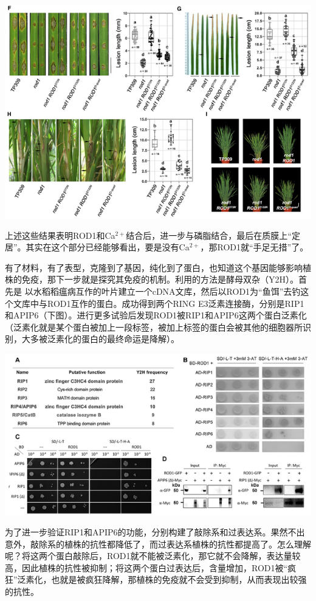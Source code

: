 \documentclass[
  10pt,
]{book}
\begin{document}
\includegraphics{figures/HeZuhuaCell2021/9.png}

上述这些结果表明ROD1和Ca\(^{2+}\)结合后，进一步与磷脂结合，最后在质膜上``定居''。其实在这个部分已经能够看出，要是没有Ca\(^{2+}\)，那ROD1就``手足无措''了。

有了材料，有了表型，克隆到了基因，纯化到了蛋白，也知道这个基因能够影响植株的免疫，那下一步就是探究其免疫的机制。利用的方法是酵母双杂（Y2H）。首先是 以水稻稻瘟病互作的叶片建立一个cDNA文库，然后以ROD1为``鱼饵''去钓这个文库中与ROD1互作的蛋白。成功得到两个RING E3泛素连接酶，分别是RIP1和APIP6（下图）。进行更多试验后发现ROD1被RIP1和APIP6这两个蛋白泛素化（泛素化就是某个蛋白被加上一段标签，被加上标签的蛋白会被其他的细胞器所识别，大多被泛素化的蛋白的最终命运是降解）。

\includegraphics{figures/HeZuhuaCell2021/10.png}

为了进一步验证RIP1和APIP6的功能，分别构建了敲除系和过表达系。果然不出意外，敲除系的植株的抗性都降低了，而过表达系植株的抗性都提高了。怎么理解呢？将这两个蛋白敲除后，ROD1就不能被泛素化，那它就不会降解，表达量较高，因此植株的抗性被抑制；将这两个蛋白过表达后，含量增加，ROD1被``疯狂''泛素化，也就是被疯狂降解，那植株的免疫就不会受到抑制，从而表现出较强的抗性。
\end{document}
